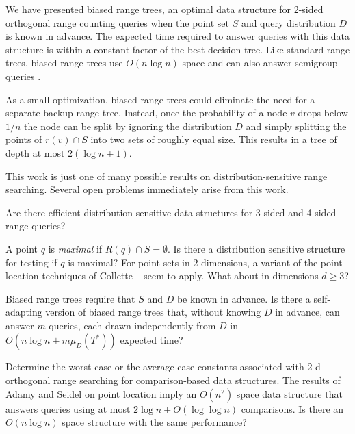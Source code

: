 \documentclass[lotsofwhite,charterfonts]{patmorin}
\begin{document}
We have presented biased range trees, an optimal data structure for
2-sided orthogonal range counting queries when the point set $S$ and
query distribution $D$ is known in advance. The expected time required
to answer queries with this data structure is within a constant factor
of the best decision tree.  Like standard range trees, biased range
trees use $O(n\log n)$ space and can also answer semigroup queries
\cite{ae133,ae292}.

As a small optimization, biased range trees could eliminate the need
for a separate backup range tree. Instead, once the probability of a
node $v$ drops below $1/n$ the node can be split by ignoring the
distribution $D$ and simply splitting the points of $r(v)\cap S$ into
two sets of roughly equal size.  This results in a tree of depth at
most $2(\log n+1)$.

This work is just one of many possible results on
distribution-sensitive range searching.  Several open problems
immediately arise from this work.

\begin{op}
Are there efficient distribution-sensitive data structures for 3-sided
and 4-sided range queries?
\end{op}

\begin{op}
A point $q$ is \emph{maximal} if $R(q)\cap S=\emptyset$.  Is there a
distribution sensitive structure for testing if $q$ is maximal?  For
point sets in 2-dimensions, a variant of the point-location techniques
of Collette \etal\ \cite{cdilm08} seem to apply.  What about in dimensions
$d\ge 3$?
\end{op}

\begin{op}
Biased range trees require that $S$ and $D$ be known in advance.  Is
there a self-adapting version of biased range trees that, without
knowing $D$ in advance, can answer $m$ queries, each drawn
independently from $D$ in $O(n\log n+ m\mu_D(T^*))$ expected time?
\end{op}

\begin{op}
Determine the worst-case or the average case constants associated with
2-d orthogonal range searching for comparison-based data structures.
The results of Adamy and Seidel \cite{as98} on point location  imply an
$O(n^2)$ space data structure that answers queries using at most
$2\log n + O(\log\log n)$ comparisons.  Is there an $O(n\log n)$ space
structure with the same performance?
\end{op}



\end{document}
